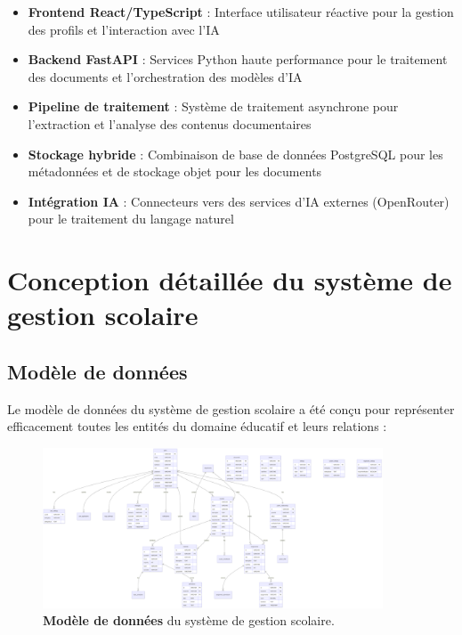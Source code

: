 \begin{itemize}
  \item \textbf{Frontend React/TypeScript} : Interface utilisateur réactive pour la gestion des profils et l'interaction avec l'IA
  
  \item \textbf{Backend FastAPI} : Services Python haute performance pour le traitement des documents et l'orchestration des modèles d'IA
  
  \item \textbf{Pipeline de traitement} : Système de traitement asynchrone pour l'extraction et l'analyse des contenus documentaires
  
  \item \textbf{Stockage hybride} : Combinaison de base de données PostgreSQL pour les métadonnées et de stockage objet pour les documents
  
  \item \textbf{Intégration IA} : Connecteurs vers des services d'IA externes (OpenRouter) pour le traitement du langage naturel
\end{itemize}

\section{Conception détaillée du système de gestion scolaire}

\subsection{Modèle de données}

Le modèle de données du système de gestion scolaire a été conçu pour représenter efficacement toutes les entités du domaine éducatif et leurs relations :

\begin{figure}[H]
  \centering
  \includegraphics[width=0.9\textwidth,keepaspectratio]{pfe-pics/diagrames/tabaales.png}
  \caption{\textbf{Modèle de données} du système de gestion scolaire.}
  \label{fig:school_data_model}
\end{figure}

